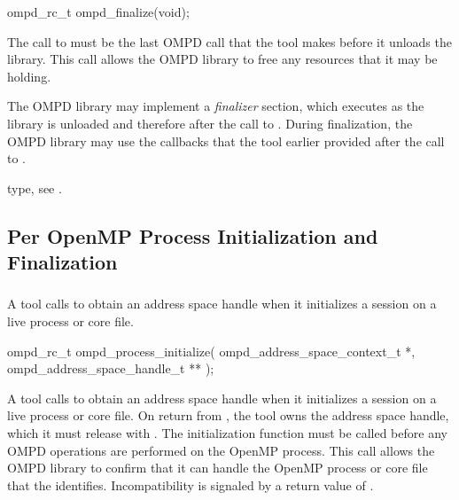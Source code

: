 \format
\begin{cspecific}
\begin{ompSyntax}
ompd_rc_t ompd_finalize(void);
\end{ompSyntax}
\end{cspecific}

\descr
The call to  must be the last OMPD call that the tool 
makes before it unloads the library. This call allows the OMPD library to
free any resources that it may be holding.

The OMPD library may implement a \emph{finalizer} section, which executes
as the library is unloaded and therefore after the call to . 
During finalization, the OMPD library may use the callbacks that the tool  
earlier provided after the call to .

\begin{crossrefs}
\item {} type, see .
\end{crossrefs}



\subsection{Per OpenMP Process Initialization and Finalization}



\subsubsection{}
\label{subsubsubsec:ompd_process_initialize}
\summary
A tool calls  to obtain an address space 
handle when it initializes a session on a live process or core file.

\format
\begin{cspecific}
\begin{ompSyntax}
ompd_rc_t ompd_process_initialize(
  ompd_address_space_context_t *,
  ompd_address_space_handle_t **
);
\end{ompSyntax}
\end{cspecific}

\descr
A tool calls  to obtain an address space 
handle when it initializes a session on a live process or core file.
On return from , the tool owns the address
space handle, which it must release with .
The initialization function must be called before any OMPD operations
are performed on the OpenMP process. This call allows the OMPD library 
to confirm that it can handle the OpenMP process or core file that the 
 identifies. Incompatibility is signaled by a 
return value of . 

